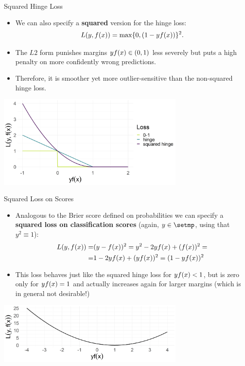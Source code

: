 \begin{vbframe}{Squared Hinge Loss}

\begin{itemize}
  \item We can also specify a \textbf{squared} version for the hinge loss:
  $$L(y, f(x)) = \max \{ 0, (1 - yf(x))\}^2.$$
  \item The $L2$ form punishes margins $y f(x) \in (0, 1)$ less severely but puts 
  a high penalty on more confidently wrong predictions. 
  \item Therefore, it is smoother yet more outlier-sensitive than the 
  non-squared hinge loss.
\end{itemize}

\begin{center}
\includegraphics[width = 0.7\textwidth]{figure/plot_loss_hinge_squared.png}
\end{center}

\end{vbframe}


\begin{vbframe}{Squared Loss on Scores}


\begin{itemize}
  \item Analogous to the Brier score defined on probabilities we can specify a 
  \textbf{squared loss on classification scores} (again, $y \in \setmp$, using 
  that $y^2 \equiv 1$):
  \begin{eqnarray*}
  L(y, f(x)) = &(y - f(x))^2 = y^2 - 2yf(x) + (f(x))^2 =\\
  = &1 - 2yf(x) + (yf(x))^2 = (1 - yf(x))^2
  \end{eqnarray*}
  \item This loss behaves just like the squared hinge loss for $y f(x) < 1$, but 
  is zero only for $y f(x) = 1$ and actually increases again for larger margins (which is in general not desirable!)
\end{itemize}

\begin{center}
\includegraphics[width = 0.7\textwidth]{figure/plot_loss_squared_scores.png}
\end{center}

\end{vbframe}



